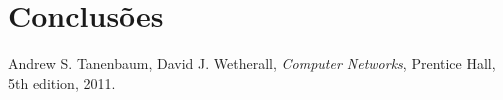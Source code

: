 \documentclass[a4paper,11pt,titlepage]{article}
\begin{document}
\section{Conclusões}

\begin{thebibliography}{9}
  Andrew S. Tanenbaum,
  David J. Wetherall,
  \emph{Computer Networks},
  Prentice Hall, 
  5th edition,
  2011.
\end{thebibliography}
\end{document}
